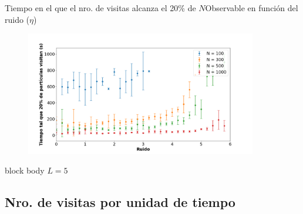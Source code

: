 \documentclass{beamer}
\begin{document}
            \begin{frame}{Tiempo en el que el nro. de visitas alcanza el 20\% de $N$}{Observable en función del ruido ($\eta$)}
                \begin{figure}[H!]
                    \includegraphics[width=0.9\textwidth]{./threshold_vs_eta-pbc}
                    \label{fig:pbc_3}
                \end{figure}
                \begin{beamercolorbox}[sep=5pt,center]{block body}
                    \small{$L=5$}
                \end{beamercolorbox}
            \end{frame}

        \subsection{Nro. de visitas por unidad de tiempo}
\end{document}
